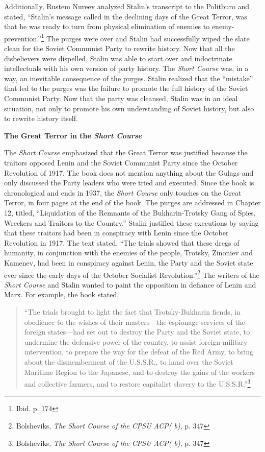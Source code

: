 \documentclass[a4paper, twocolumn]{article}
\begin{document}
Additionally, Rustem Nureev analyzed Stalin's transcript to the
Politburo and stated, ``Stalin's message called in the declining days
of the Great Terror, was that he was ready to turn from physical
elimination of enemies to enemy-prevention.''\footnote{Ibid. p. 174} The purges were over
and Stalin had successfully wiped the slate clean for the Soviet Communist
Party to rewrite history. Now that all the disbelievers were dispelled, Stalin was able
to start over and indoctrinate intellectuals with his own version of
party history. The \emph{Short Course} was, in a way, an inevitable
consequence of the purges. Stalin realized that the ``mistake'' that led
to the purges was the failure to promote the full history of the
Soviet Communist Party. Now that the party was cleansed, Stalin was in an
ideal situation, not only to promote his own understanding of Soviet
history, but also to rewrite history itself.


\begin{center}\textbf{The Great Terror in the \emph{Short Course}}\end{center}

	The \emph{Short Course} emphasized that the Great Terror was justified
    because the traitors opposed Lenin and the Soviet Communist Party since
    the October Revolution of 1917. The book does not mention anything about
    the Gulags and only discussed the Party leaders who were tried and
    executed. Since the book is chronological and ends in 1937, the
    \emph{Short Course} only touches on the Great Terror, in four pages at
    the end of the book. The purges are addressed in Chapter 12,
    titled, ``Liquidation of the Remnants of the Bukharin-Trotsky Gang
    of Spies, Wreckers and Traitors to the Country.'' Stalin justified
    these executions by saying that these traitors had been in
    conspiracy with Lenin since the October Revolution in 1917. The
    text stated, ``The trials showed that these dregs of humanity, in
    conjunction with the enemies of the people, Trotsky, Zinoniev and
    Kamenev, had been in conspiracy against Lenin, the Party and the
    Soviet state ever since the early days of the October Socialist
    Revolution.''\footnote{Bolsheviks, \emph{The Short Course of the CPSU ACP( b)}, p. 347} The writers of the \emph{Short Course} and Stalin wanted
    to paint the opposition in defiance of Lenin and Marx. For
    example, the book stated,

\begin{quote}
``The trials brought to light the fact that Trotsky-Bukharin fiends, in
obedience to the wishes of their masters—the espionage services of the
foreign states—had set out to destroy the Party and the Soviet state,
to undermine the defensive power of the country, to assist foreign
military intervention, to prepare the way for the defeat of the Red
Army, to bring about the dismemberment of the U.S.S.R., to hand over
the Soviet Maritime Region to the Japanese, and to destroy the gains
of the workers and collective farmers, and to restore capitalist
slavery to the U.S.S.R.''\footnote{Bolsheviks, \emph{The Short Course of the CPSU ACP( b)}, p. 347}
\end{quote}
\end{document}
